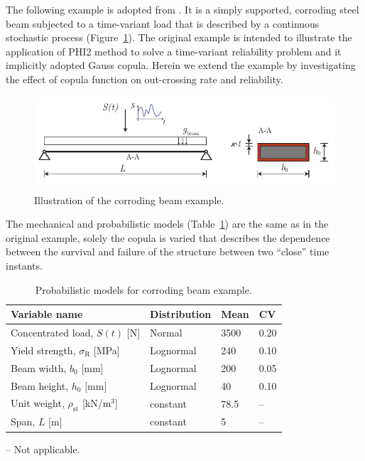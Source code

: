The following example is adopted from \citet{Sudret2008anal}. It is a simply supported, corroding steel beam subjected to a time-variant load that is described by a continuous stochastic process (Figure~\ref{fig:corr_beam}). The original example is intended to illustrate the application of PHI2 method to solve a time-variant reliability problem and it implicitly adopted Gauss copula. Herein we extend the example by investigating the effect of copula function on out-crossing rate and reliability.

\begin{figure}[htbp!] 
	\centering    
	\includegraphics[]{corroding_beam_illustration_.pdf}
	\caption{Illustration of the corroding beam example.}
	\label{fig:corr_beam}
\end{figure}

The mechanical and probabilistic models (Table~\ref{tab:prob_models_corr_beam}) are the same as in the original example, solely the copula is varied that describes the dependence between the survival and failure of the structure between two ``close'' time instants.

\begin{table}[htbp!]
\caption{Probabilistic models for corroding beam example.}
\centering
\label{tab:prob_models_corr_beam}
\small
	\begin{threeparttable}
    \begin{tabular}{llll}
    \toprule
    Variable name  & Distribution & Mean & CV\\
    \midrule
    \rowcolor{lightgrey} Concentrated load, $S(t)$ [N]  & Normal & 3500 & 0.20  \\
    Yield strength, $\sigma_\mathrm{R}$ [MPa]  & Lognormal & 240 & 0.10  \\
    \rowcolor{lightgrey} Beam width, $b_0$ [mm]  & Lognormal & 200 & 0.05  \\
    Beam height, $h_0$ [mm]  & Lognormal & 40 & 0.10  \\
    \rowcolor{lightgrey} Unit weight, $\rho_\mathrm{st}$ [kN/$\mathrm{m}^3$]  & constant & 78.5 & --  \\
    Span, $L$ [m]  & constant & 5 & -- \\
    \bottomrule
    \end{tabular}
    \begin{tablenotes}
    	\item -- Not applicable.
    \end{tablenotes}
    \end{threeparttable}
\end{table}


